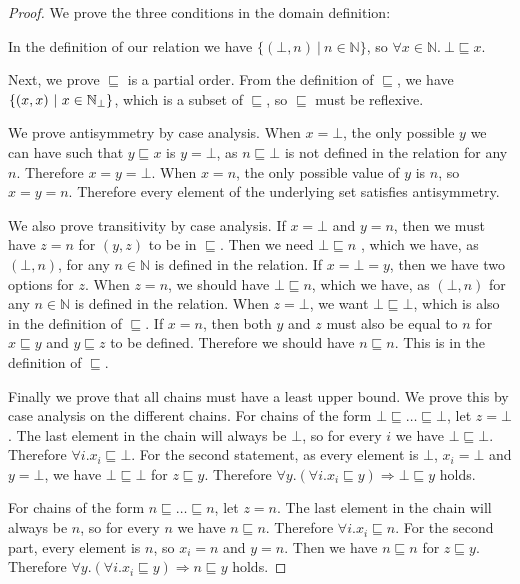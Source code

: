 \begin{proof}
We prove the three conditions in the domain definition:

In the definition of our relation we have $\{ (\bot , n) \ | \ n \in \mathbb{N} \}$, so $\forall x \in \mathbb{N}. \ \bot \sqsubseteq x$.

Next, we prove $\sqsubseteq$ is a partial order. From the  definition of $\sqsubseteq$, we have $\{(x,x) \ | \ x \in \mathbb{N}_{\bot} \}$, which is a subset of $\sqsubseteq$, so $\sqsubseteq$ must be reflexive.

We prove antisymmetry by case analysis. When $x = \bot$, the only possible $y$ we can have such that $y \sqsubseteq x$ is $y = \bot$, as  $n \sqsubseteq \bot$ is not defined in the relation for any $n$. Therefore $x = y = \bot$. When $x = n$, the only possible value of $y$ is $n$, so $x = y = n$. Therefore every element of the underlying set satisfies antisymmetry.

We also prove transitivity by case analysis. If $x = \bot$ and $y =n$, then we must have $z = n$ for $(y,z)$ to be in $\sqsubseteq$. Then we need $\bot \sqsubseteq n$ , which we have, as $(\bot, n)$, for any $n \in \mathbb{N}$ is defined in the relation. If $x = \bot = y$, then we have two options for $z$. When $z = n$, we should have $\bot \sqsubseteq n$, which we have, as $(\bot, n)$ for any $n \in \mathbb{N}$ is defined in the relation. When $z = \bot$, we want $ \bot \sqsubseteq \bot$, which is also in the definition of $\sqsubseteq$. If $x = n$, then both $y$ and $z$ must also be equal to $n$ for $x \sqsubseteq y$ and $y \sqsubseteq z$ to be defined. Therefore we should  have $n \sqsubseteq n$. This is in the definition of $\sqsubseteq$.

Finally we prove that all chains must have a least upper bound. We prove this by case analysis on the different chains. For  chains of the form $\bot \sqsubseteq \dots \sqsubseteq \bot$, let $z = \bot$. The last element in the chain will always be $\bot$, so for every $i$ we have $\bot \sqsubseteq \bot$. Therefore $\forall i . x_i \sqsubseteq \bot$.
For the second statement, as every element is $\bot$, $x_i = \bot$ and $y = \bot$, we have $\bot \sqsubseteq \bot$ for $z \sqsubseteq y$. Therefore $\forall y. (\forall i . x_i \sqsubseteq y) \Rightarrow \bot \sqsubseteq y$ holds.

For chains of the form $n \sqsubseteq \dots \sqsubseteq n$, let $z = n$. The last element in the chain will always be $n$, so for every $n$ we have $n \sqsubseteq n$. Therefore $\forall i . x_i \sqsubseteq n$. For the second part, every element is $n$, so $x_i = n$ and $y = n$. Then we have $n \sqsubseteq n$ for $z \sqsubseteq y$. Therefore $\forall y. (\forall i . x_i \sqsubseteq y) \Rightarrow n \sqsubseteq y$ holds.


\end{proof}
